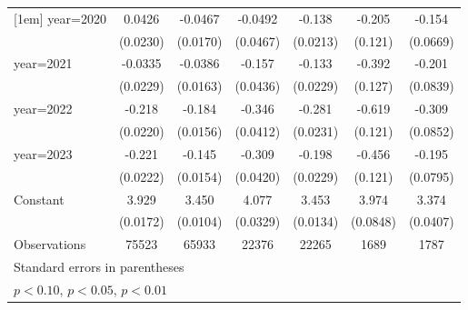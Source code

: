\begin{table}[htbp]
\begin{tabular}{l*{6}{c}}
[1em]
year=2020           &      0.0426\sym{*}  &     -0.0467\sym{***}&     -0.0492         &      -0.138\sym{***}&      -0.205\sym{*}  &      -0.154\sym{**} \\
                    &    (0.0230)         &    (0.0170)         &    (0.0467)         &    (0.0213)         &     (0.121)         &    (0.0669)         \\
[1em]
year=2021           &     -0.0335         &     -0.0386\sym{**} &      -0.157\sym{***}&      -0.133\sym{***}&      -0.392\sym{***}&      -0.201\sym{**} \\
                    &    (0.0229)         &    (0.0163)         &    (0.0436)         &    (0.0229)         &     (0.127)         &    (0.0839)         \\
[1em]
year=2022           &      -0.218\sym{***}&      -0.184\sym{***}&      -0.346\sym{***}&      -0.281\sym{***}&      -0.619\sym{***}&      -0.309\sym{***}\\
                    &    (0.0220)         &    (0.0156)         &    (0.0412)         &    (0.0231)         &     (0.121)         &    (0.0852)         \\
[1em]
year=2023           &      -0.221\sym{***}&      -0.145\sym{***}&      -0.309\sym{***}&      -0.198\sym{***}&      -0.456\sym{***}&      -0.195\sym{**} \\
                    &    (0.0222)         &    (0.0154)         &    (0.0420)         &    (0.0229)         &     (0.121)         &    (0.0795)         \\
[1em]
Constant            &       3.929\sym{***}&       3.450\sym{***}&       4.077\sym{***}&       3.453\sym{***}&       3.974\sym{***}&       3.374\sym{***}\\
                    &    (0.0172)         &    (0.0104)         &    (0.0329)         &    (0.0134)         &    (0.0848)         &    (0.0407)         \\
\hline
Observations        &       75523         &       65933         &       22376         &       22265         &        1689         &        1787         \\
\hline\hline
\multicolumn{7}{l}{\footnotesize Standard errors in parentheses}\\
\multicolumn{7}{l}{\footnotesize \sym{*} \(p<0.10\), \sym{**} \(p<0.05\), \sym{***} \(p<0.01\)}\\
\end{tabular}
\end{table}
